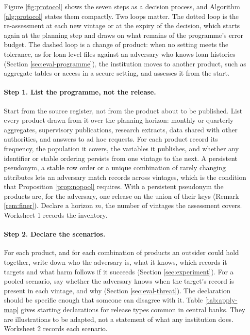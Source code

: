Figure \ref{fig:protocol} shows the seven steps as a decision process, and
Algorithm \ref{alg:protocol} states them compactly. Two loops matter. The dotted
loop is the re-assessment at each new vintage or at the expiry of the decision,
which starts again at the planning step and draws on what remains of the
programme's error budget. The dashed loop is a change of product: when no setting
meets the tolerance, as for loan-level files against an adversary who knows loan
histories (Section \ref{sec:eval-programme}), the institution moves to another
product, such as aggregate tables or access in a secure setting, and assesses it
from the start.





\paragraph{Step 1. List the programme, not the release.}
Start from the source register, not from the product about to be published. List
every product drawn from it over the planning horizon: monthly or quarterly
aggregates, supervisory publications, research extracts, data shared with other
authorities, and answers to ad hoc requests. For each product record its
frequency, the population it covers, the variables it publishes, and whether any
identifier or stable ordering persists from one vintage to the next. A persistent
pseudonym, a stable row order or a unique combination of rarely changing
attributes lets an adversary match records across vintages, which is the condition that Proposition \ref{prop:nopool} requires. With a persistent pseudonym the products are, for the adversary, one release on the union of their keys (Remark \ref{rem:finer}). Declare a horizon $m$,
the number of vintages the assessment covers. Worksheet 1 records the inventory.

\paragraph{Step 2. Declare the scenarios.}
For each product, and for each combination of products an outsider could hold
together, write down who the adversary is, what it knows, which records it
targets and what harm follows if it succeeds (Section \ref{sec:experiment}). For a
pooled scenario, say whether the adversary knows when the target's record is
present in each vintage, and why (Section \ref{sec:eval-threat}). The
declaration should be specific enough that someone can disagree with it. Table
\ref{tab:apply-map} gives starting declarations for release types common in
central banks. They are illustrations to be adapted, not a statement of what any
institution does. Worksheet 2 records each scenario.

